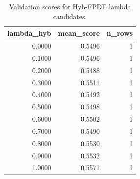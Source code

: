 \begin{table}[t]
\caption{Validation scores for Hyb-FPDE lambda candidates.}
\label{tab:lambda_distribution_computed}
\centering
\begin{tabular}{rrr}
\toprule
lambda\_hyb & mean\_score & n\_rows \\
\midrule
0.0000 & 0.5496 & 1 \\
0.1000 & 0.5496 & 1 \\
0.2000 & 0.5488 & 1 \\
0.3000 & 0.5511 & 1 \\
0.4000 & 0.5492 & 1 \\
0.5000 & 0.5498 & 1 \\
0.6000 & 0.5502 & 1 \\
0.7000 & 0.5490 & 1 \\
0.8000 & 0.5530 & 1 \\
0.9000 & 0.5532 & 1 \\
1.0000 & 0.5571 & 1 \\
\bottomrule
\end{tabular}

\end{table}
